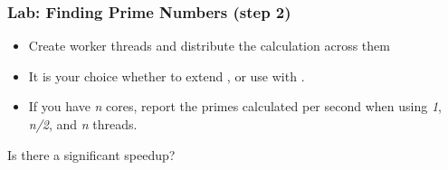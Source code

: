 \begin{slide}
\frametitle{Lab: Finding Prime Numbers (step 2)}
\begin{itemize}
\item Create worker threads and distribute the calculation across them
\item It is your choice whether to extend , or use
 with .
\item If you have \textit{n} cores, report the primes calculated per second when 
using \textit{1}, \textit{n/2}, and \textit{n} threads. 
\end{itemize}
Is there a significant speedup?
\end{slide}


